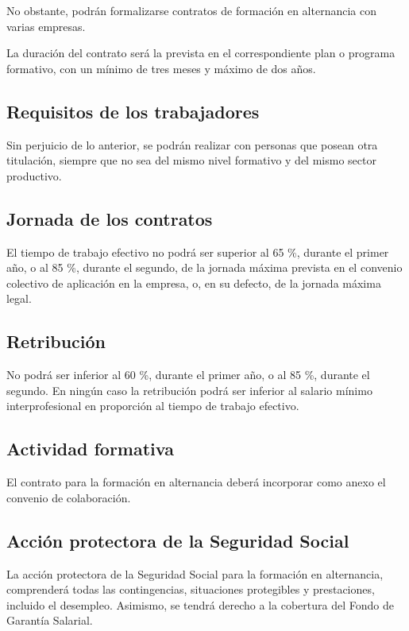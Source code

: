 \documentclass{article}
\begin{document}
	No obstante, podrán formalizarse contratos de formación en alternancia con varias empresas.
	
	La duración del contrato será la prevista en el correspondiente plan o programa formativo, con un mínimo de tres meses y máximo de dos años.
	
	\subsection*{Requisitos de los trabajadores}
	
	Sin perjuicio de lo anterior, se podrán realizar con personas que posean otra titulación, siempre que no sea del mismo nivel formativo y del mismo sector productivo.
	
	\subsection*{Jornada de los contratos}
	
	El tiempo de trabajo efectivo no podrá ser superior al 65 \%, durante el primer año, o al 85 \%, durante el segundo, de la jornada máxima prevista en el convenio colectivo de aplicación en la empresa, o, en su defecto, de la jornada máxima legal.
	
	\subsection*{Retribución}
	
	No podrá ser inferior al 60 \%, durante el primer año, o al 85 \%, durante el segundo. En ningún caso la retribución podrá ser inferior al salario mínimo interprofesional en proporción al tiempo de trabajo efectivo.
	
	\subsection*{Actividad formativa}
	
	El contrato para la formación en alternancia deberá incorporar como anexo el convenio de colaboración.
	
	\subsection*{Acción protectora de la Seguridad Social}
	
	La acción protectora de la Seguridad Social para la formación en alternancia, comprenderá todas las contingencias, situaciones protegibles y prestaciones, incluido el desempleo. Asimismo, se tendrá derecho a la cobertura del Fondo de Garantía Salarial.
	
\end{document}
